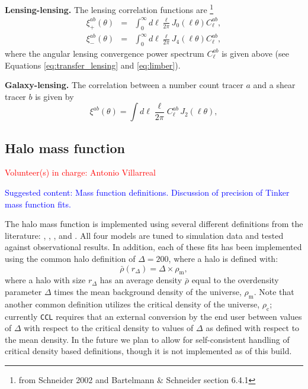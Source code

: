 \documentclass[\docopts]{\docclass}
\newcommand{\vol}[1]{\textcolor{red}{Volunteer(s) in charge: #1}}
\newcommand{\cont}[1]{\textcolor{blue}{Suggested content: #1}}
\newcommand{\ccl}{{\tt CCL}\xspace}
\begin{document}
{\bf Lensing-lensing.} The lensing correlation functions are \footnote{from Schneider 2002 and Bartelmann \& Schneider section 6.4.1}
\begin{eqnarray}
  \xi^{ab}_{+}(\theta)&=&\int_0^{\infty}d\ell\frac{\ell}{2\pi}J_0(\ell\theta)C^{ab}_\ell,\\
  \xi^{ab}_{-}(\theta)&=&\int_0^{\infty}d\ell\frac{\ell}{2\pi}J_4(\ell\theta)C^{ab}_\ell,
\label{eq:xipxim}
\end{eqnarray}
where the angular lensing convergence power spectrum $C^{ab}_\ell$ is given above (see Equations \ref{eq:transfer_lensing} and \ref{eq:limber}).

{\bf Galaxy-lensing.} The correlation between a number count tracer $a$ and a shear tracer $b$ is given by
\begin{equation}
  \xi^{ab}(\theta) = \int d\ell \frac{\ell}{2\pi} C^{ab}_\ell\, J_2(\ell\theta),
\end{equation}



\subsection{Halo mass function}
\vol{Antonio Villarreal}

\cont{Mass function definitions. Discussion of precision of Tinker mass function fits.}

The halo mass function is implemented using several different definitions from the literature: \citet{Tinker2008}, \citet{Tinker2010}, \citet{Angulo2012}, and \citet{Watson2013}. All four models are tuned to simulation data and tested against observational results. In addition, each of these fits has been implemented using the common halo definition of $\Delta = 200$, where a halo is defined with:
\begin{equation}
\bar{\rho}(r_{\Delta}) = \Delta \times \rho_{\mathrm{m}},
\end{equation}
where a halo with size $r_{\Delta}$ has an average density $\bar{\rho}$ equal to the overdensity parameter $\Delta$ times the mean background density of the universe, $\rho_{\mathrm{m}}$. Note that another common definition utilizes the critical density of the universe, $\rho_{\mathrm{c}}$; currently \ccl requires that an external conversion by the end user between values of $\Delta$ with respect to the critical density to values of $\Delta$ as defined with respect to the mean density. In the future we plan to allow for self-consistent handling of critical density based definitions, though it is not implemented as of this build.
\end{document}
